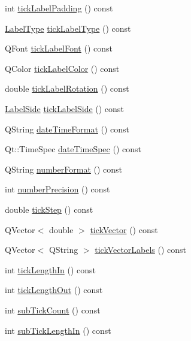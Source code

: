 \begin{DoxyCompactItemize}
\item 
int \hyperlink{classQCPAxis_af7bc2fac3f95949ecd0204d20dc1463b}{tick\+Label\+Padding} () const 
\item 
\hyperlink{classQCPAxis_a4a7da0166f755f5abac23b765d184cad}{Label\+Type} \hyperlink{classQCPAxis_a8a6f58a1ce12cfc4fadd379167668e8d}{tick\+Label\+Type} () const 
\item 
Q\+Font \hyperlink{classQCPAxis_af6d7ad17f3398b114a413f7a3dc5ef9d}{tick\+Label\+Font} () const 
\item 
Q\+Color \hyperlink{classQCPAxis_ac86d0636aa55ddd94df171f609897a32}{tick\+Label\+Color} () const 
\item 
double \hyperlink{classQCPAxis_ab9199d72b8c4c06cc6c9b928c30d00d2}{tick\+Label\+Rotation} () const 
\item 
\hyperlink{classQCPAxis_a24b13374b9b8f75f47eed2ea78c37db9}{Label\+Side} \hyperlink{classQCPAxis_a0a33835705406506b02a445b1ba32357}{tick\+Label\+Side} () const 
\item 
Q\+String \hyperlink{classQCPAxis_a132b54ae184a12ed24c9af24f53dc70b}{date\+Time\+Format} () const 
\item 
Qt\+::\+Time\+Spec \hyperlink{classQCPAxis_afdd04c56ed29a9d948f840fc76f0d383}{date\+Time\+Spec} () const 
\item 
Q\+String \hyperlink{classQCPAxis_ae6729b40845b29ffa5a440aa53cec215}{number\+Format} () const 
\item 
int \hyperlink{classQCPAxis_a91cb2825060ac79a889296377fe0c7c1}{number\+Precision} () const 
\item 
double \hyperlink{classQCPAxis_a0e6120d24266544441ab691f316a1b03}{tick\+Step} () const 
\item 
Q\+Vector$<$ double $>$ \hyperlink{classQCPAxis_a5b00b14f480f926df976cc6c52309e78}{tick\+Vector} () const 
\item 
Q\+Vector$<$ Q\+String $>$ \hyperlink{classQCPAxis_a64e6fa81f943ad33dcaf3fa606687b93}{tick\+Vector\+Labels} () const 
\item 
int \hyperlink{classQCPAxis_a59265d65c5034695ac2578bccbbb0f4a}{tick\+Length\+In} () const 
\item 
int \hyperlink{classQCPAxis_ae1b3d7473f50ba8544b2027c1cdc80f2}{tick\+Length\+Out} () const 
\item 
int \hyperlink{classQCPAxis_a290b4c1375476826daa10e914cb71dab}{sub\+Tick\+Count} () const 
\item 
int \hyperlink{classQCPAxis_a052e6ab2ada7e87fa5e5831dcbd4a517}{sub\+Tick\+Length\+In} () const 
\item 

\end{DoxyCompactItemize}
